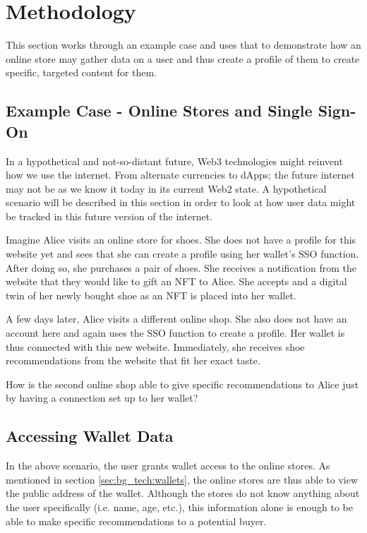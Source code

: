 \chapter{Methodology}
\label{ch:methodology}
This section works through an example case and uses that to demonstrate how an online store may gather data on a user and thus create a profile of them to create specific, targeted content for them.


%
%
\section{Example Case - Online Stores and Single Sign-On}
\label{sec:methodology:caseStudy}
In a hypothetical and not-so-distant future, Web3 technologies might reinvent how we use the internet. From alternate currencies to dApps; the future internet may not be as we know it today in its current Web2 state. A hypothetical scenario will be described in this section in order to look at how user data might be tracked in this future version of the internet.

Imagine Alice visits an online store for shoes. She does not have a profile for this website yet and sees that she can create a profile using her wallet's SSO function. After doing so, she purchases a pair of shoes. She receives a notification from the website that they would like to gift an NFT to Alice. She accepts and a digital twin of her newly bought shoe as an NFT is placed into her wallet.

A few days later, Alice visits a different online shop. She also does not have an account here and again uses the SSO function to create a profile. Her wallet is thus connected with this new website. Immediately, she receives shoe recommendations from the website that fit her exact taste.

How is the second online shop able to give specific recommendations to Alice just by having a connection set up to her wallet?


%
%
\section{Accessing Wallet Data}
\label{sec:methodology:data}
In the above scenario, the user grants wallet access to the online stores. As mentioned in section \ref{sec:bg_tech:wallets}, the online stores are thus able to view the public address of the wallet. Although the stores do not know anything about the user specifically (i.e. name, age, etc.), this information alone is enough to be able to make specific recommendations to a potential buyer.

